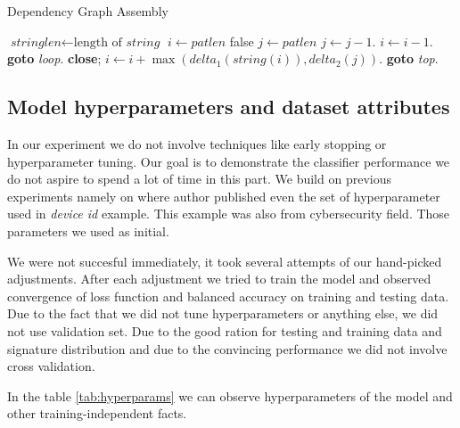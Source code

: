 
\begin{algorithm}
  \caption{Dependency Graph Assembly}\label{algo:hmillbinary}
  \begin{algorithmic}[1]
      \State $\textit{stringlen} \gets \text{length of }\textit{string}$
      \State $i \gets \textit{patlen}$
       \Return false
      \EndIf
      \State $j \gets \textit{patlen}$
      \State $j \gets j-1$.
      \State $i \gets i-1$.
      \State \textbf{goto} \emph{loop}.
      \State \textbf{close};
      \EndIf
      \State $i \gets i+\max(\textit{delta}_1(\textit{string}(i)),\textit{delta}_2(j))$.
      \State \textbf{goto} \emph{top}.
      \EndProcedure
  \end{algorithmic}
\end{algorithm}

\subsection{Model hyperparameters and dataset attributes}
In our experiment we do not involve techniques like early stopping or hyperparameter tuning. Our goal is to demonstrate the classifier performance we do not aspire to spend a lot of time in this part. We build on previous experiments namely on \cite{Mandlik2020} where author published even the set of hyperparameter used in \emph{device id} example. This example was also from cybersecurity field. Those parameters we used as initial.

We were not succesful immediately, it took several attempts of our hand-picked adjustments. After each adjustment we tried to train the model and observed convergence of loss function and balanced accuracy on training and testing data. Due to the fact that we did not tune hyperparameters or anything else, we did not use validation set. Due to the good ration for testing and training data and signature distribution and due to the convincing performance we did not involve cross validation.

In the table \ref{tab:hyperparams} we can observe hyperparameters of the model and other training-independent facts.


